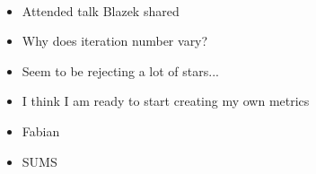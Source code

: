 \documentclass[a4 paper]{article}
\numberwithin{equation}{section}
\newcommand{\0}{\mathbf{0}}
\begin{document}
\clearpage
{}\\ 
\begin{itemize}
    \item Attended talk Blazek shared
    \item Why does iteration number vary?
    \item Seem to be rejecting a lot of stars...
    \item I think I am ready to start creating my own metrics
    \item Fabian 
    \item SUMS
\end{itemize}
\end{document}
